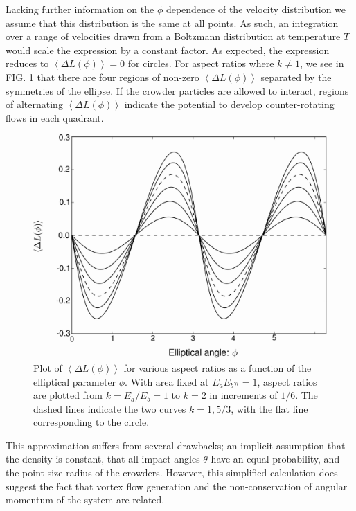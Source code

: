 Lacking further information on the $\phi$ dependence of the velocity distribution we assume that this distribution is the same at all points. As such, an integration over a range of velocities drawn from a Boltzmann distribution at temperature $T$ would scale the expression by a constant factor. As expected, the expression reduces to $\left < \Delta L(\phi) \right >=0$ for circles. For aspect ratios where $k \neq 1$, we see in FIG. \ref{fig:delta_L} that there are four regions of non-zero $\left < \Delta L(\phi) \right >$ separated by the symmetries of the ellipse. If the crowder particles are allowed to interact, regions of alternating $\left < \Delta L(\phi) \right >$ indicate the potential to develop counter-rotating flows in each quadrant. 
%
\begin{figure}
\includegraphics[width=\figurewidthSINGLE]{tex/entropic_flow_paper/FIG5_EDIT.jpg}
\caption{Plot of $\left < \Delta L(\phi) \right >$ for various aspect ratios as a function of the elliptical parameter $\phi$. With area fixed at $E_a E_b \pi=1$, aspect ratios are plotted from $k=E_a/E_b=1$ to $k=2$ in increments of $1/6$. The dashed lines indicate the two curves $k=1,5/3$, with the flat line corresponding to the circle. }
\label{fig:delta_L}
\end{figure}
%
This approximation suffers from several drawbacks; an implicit assumption that the density is constant, that all impact angles $\theta$ have an equal probability, and the point-size radius of the crowders. However, this simplified calculation does suggest the fact that  vortex flow generation and the non-conservation of angular momentum of the system are related.

